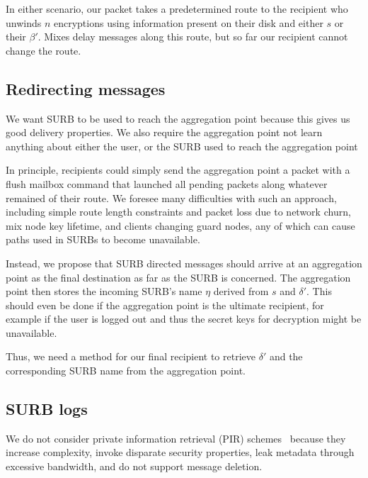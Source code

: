 \documentclass[twoside,letterpaper]{llncs}
\begin{document}
In either scenario, our packet takes a predetermined route to the
recipient who unwinds $n$ encryptions using information present on
their disk and either $s$ or their $\beta'$.  Mixes delay
messages along this route, but so far our recipient cannot change
the route. 

\subsection{Redirecting messages}

We want SURB to be used to reach the aggregation point because
this gives us good delivery properties.  We also require the
aggregation point not learn anything about either the user, or
the SURB used to reach the aggregation point

In principle, recipients could simply send the aggregation point
a packet with a flush mailbox command that launched all pending
packets along whatever remained of their route.  We foresee many
difficulties with such an approach, including simple route length
constraints and packet loss due to network churn, mix node key
lifetime, and clients changing guard nodes, any of which can cause
paths used in SURBs to become unavailable.

Instead, we propose that SURB directed messages should arrive at
an aggregation point as the final destination as far as the SURB
is concerned. The aggregation point then stores  the incoming SURB's
name $\eta$ derived from $s$ and $\delta'$.
This should even be done if the aggregation point is the ultimate
recipient, for example if the user is logged out and thus the
secret keys for decryption might be unavailable.  

Thus, we need a method for our final recipient to retrieve
$\delta'$ and the corresponding SURB name from the aggregation point.


\subsection{SURB logs}

We do not consider private information retrieval (PIR)
schemes~\cite{pir} because they increase complexity, invoke disparate
security properties, leak metadata through excessive bandwidth, and do
not support message deletion.
\end{document}
